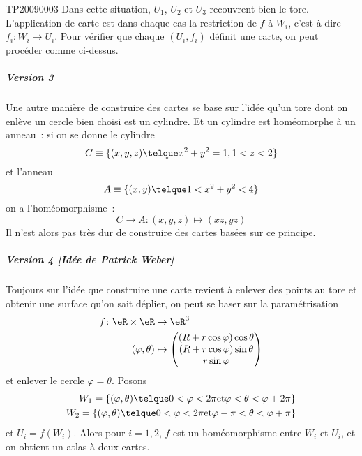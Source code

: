\begin{corrige}{TP20090003}
Dans cette situation, $U_1$, $U_2$ et $U_3$ recouvrent bien le
tore. L'application de carte est dans chaque cas la restriction de $f$
à $W_i$, c'est-à-dire $f_i : W_i \to
U_i$. Pour vérifier que chaque $(U_i,f_i)$ définit une carte, on peut
procéder comme ci-dessus.

\subparagraph{Version 3}
Une autre manière de construire des cartes se base sur l'idée qu'un
tore dont on enlève un cercle bien choisi est un cylindre. Et un
cylindre est homéomorphe à un anneau~: si on se donne le cylindre
\begin{equation*}
  C \equiv \{ (x,y,z) \telque x^2 + y^2 = 1, 1 < z < 2 \}
\end{equation*}
et l'anneau
\begin{equation*}
  A \equiv \{ (x,y) \telque 1 < x^2 + y^2 < 4 \}
\end{equation*}
on a l'homéomorphisme~:
\begin{equation*}
  C \to A : (x,y,z) \mapsto (x z, y z)
\end{equation*}
Il n'est alors pas très dur de construire des cartes basées sur ce
principe.

\subparagraph{Version 4 [Idée de Patrick Weber]}
Toujours sur l'idée que construire une carte revient à enlever des
points au tore et obtenir une surface qu'on sait déplier, on peut se
baser sur la paramétrisation 
\begin{equation}
	\begin{aligned}
		f\colon \eR\times\eR&\to \eR^3 \\
		(\varphi,\theta)&\mapsto \begin{pmatrix}
			(R+r\cos\varphi)\cos\theta	\\ 
			(R+r\cos\varphi)\sin\theta	\\ 
			r\sin\varphi	
		\end{pmatrix}
	\end{aligned}
\end{equation}
et enlever le cercle $\varphi=\theta$. Posons
\begin{equation*}
  \begin{split}
    W_1 = \{ (\varphi,\theta) \telque 0 < \varphi < 2\pi \text{et}
    \varphi
    < \theta < \varphi + 2\pi \}\\
    W_2 = \{ (\varphi,\theta) \telque 0 < \varphi < 2\pi \text{et}
    \varphi - \pi < \theta < \varphi + \pi \}
  \end{split}
\end{equation*}
et $U_i = f(W_i)$. Alors pour $i = 1, 2$, $f$ est un homéomorphisme entre $W_i$ et
$U_i$, et on obtient un atlas à deux cartes.


\end{corrige}
